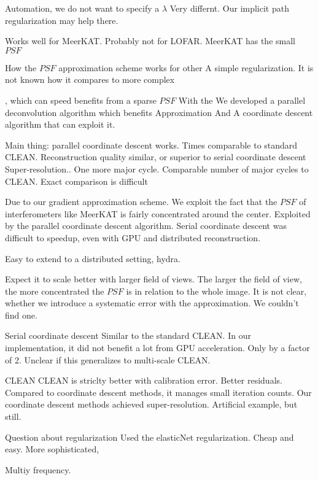 Automation, we do not want to specify a $\lambda$
Very differnt.
Our implicit path regularization may help there.


Works well for MeerKAT. Probably not for LOFAR. MeerKAT has the small $PSF$










How the $PSF$ approximation scheme works for other 
A simple regularization. It is not known how it compares to more complex 


 , which can speed benefits from a sparse $PSF$ With the  We developed a parallel deconvolution algorithm which benefits
Approximation
And A coordinate descent algorithm that can  exploit it.

Main thing: parallel coordinate descent works.
Times comparable to standard CLEAN.
Reconstruction quality similar, or superior to serial coordinate descent
Super-resolution..
One more major cycle.
Comparable number of major cycles to CLEAN. Exact comparison is difficult

Due to our gradient approximation scheme. We exploit the fact that the $PSF$ of interferometers like MeerKAT is fairly concentrated around the center.
Exploited by the parallel coordinate descent algorithm. 
Serial coordinate descent was difficult to speedup, even with GPU and distributed reconstruction.

Easy to extend to a distributed setting, hydra.

Expect it to scale better with larger field of views. The larger the field of view, the more concentrated the $PSF$ is in relation to the whole image.
It is not clear, whether we introduce a systematic error with the approximation. We couldn't find one.

Serial coordinate descent
Similar to the standard CLEAN.
In our implementation, it did not benefit a lot from GPU acceleration. Only by a factor of 2. Unclear if this generalizes to multi-scale CLEAN.

CLEAN
CLEAN is striclty better with calibration error.
Better residuals. Compared to coordinate descent methods, it manages small iteration counts.
Our coordinate descent methods achieved super-resolution. Artificial example, but still.

Question about regularization
Used the elasticNet regularization. Cheap and easy. More sophisticated, 

Multiy frequency.



